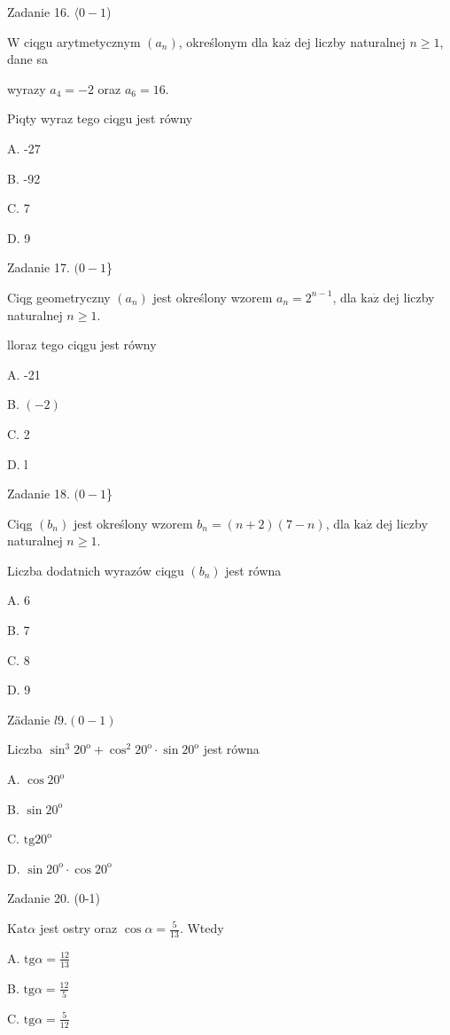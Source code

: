 \documentclass[a4paper,12pt]{article}
\begin{document}
Zadanie 16. $\langle 0-1$)

$\mathrm{W}$ ciqgu arytmetycznym $(a_{n})$, określonym dla $\mathrm{k}\mathrm{a}\dot{\mathrm{z}}$ dej liczby naturalnej $n\geq 1$, dane sa

wyrazy $a_{4}=-2$ oraz $a_{6}=16.$

Piqty wyraz tego ciqgu jest równy

A. -27

B. -92

C. 7

D. 9

Zadanie 17. $(0-1$\}

Ciqg geometryczny $(a_{n})$ jest określony wzorem $a_{n}=2^{n-1}$, dla $\mathrm{k}\mathrm{a}\dot{\mathrm{z}}$ dej liczby naturalnej $n\geq 1.$

lloraz tego ciqgu jest równy

A. -21

B. $(-2)$

C. 2

D. l

Zadanie 18. $(0-1$\}

Ciqg $(b_{n})$ jest określony wzorem $b_{n}=(n+2)(7-n)$, dla $\mathrm{k}\mathrm{a}\dot{\mathrm{z}}$ dej liczby naturalnej $n\geq 1.$

Liczba dodatnich wyrazów ciqgu $(b_{n})$ jest równa

A. 6

B. 7

C. 8

D. 9

Zädanie $l9. (0-1)$

Liczba $\sin^{3}20^{\mathrm{o}}+\cos^{2}20^{\mathrm{o}}\cdot\sin 20^{\mathrm{o}}$ jest równa

A. $\cos 20^{\mathrm{o}}$

B. $\sin 20^{\mathrm{o}}$

C. $\mathrm{t}\mathrm{g}20^{\mathrm{o}}$

D. $\sin 20^{\mathrm{o}}\cdot\cos 20^{\mathrm{o}}$

Zadanie 20. (0-1)

$\mathrm{K}\mathrm{a}\mathrm{t} \alpha$ jest ostry oraz $\cos\alpha= \displaystyle \frac{5}{13}$. Wtedy

A. $\displaystyle \mathrm{t}\mathrm{g}\alpha=\frac{12}{13}$

B. $\displaystyle \mathrm{t}\mathrm{g}\alpha=\frac{12}{5}$

C. $\displaystyle \mathrm{t}\mathrm{g}\alpha=\frac{5}{12}$
\end{document}
